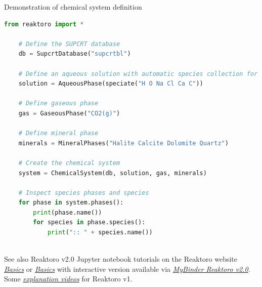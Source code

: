 %
%
\begin{frame}{Demonstration of chemical system definition}
	
\begin{lstlisting}[language=Python, caption=System definition]
    from reaktoro import *

    # Define the SUPCRT database
    db = SupcrtDatabase("supcrtbl")

    # Define an aqueous solution with automatic species collection for selected elements
    solution = AqueousPhase(speciate("H O Na Cl Ca C")) 

    # Define gaseous phase
    gas = GaseousPhase("CO2(g)")

    # Define mineral phase
    minerals = MineralPhases("Halite Calcite Dolomite Quartz")

    # Create the chemical system
    system = ChemicalSystem(db, solution, gas, minerals)
    
    # Inspect species phases and species
    for phase in system.phases():
        print(phase.name())
        for species in phase.species():
            print(":: " + species.name())
	
\end{lstlisting}
See also Reaktoro v2.0 Jupyter notebook tutorials on the Reaktoro website
%
\href{https://reaktoro.org/tutorials/basics/index.html}{\textcolor{indigo(dye)}{\it Basics}} or 
\href{https://github.com/mtsveta/reaktoro-v2-workshop/tree/main/tutorials/basics}{\textcolor{indigo(dye)}{\it Basics}} with interactive version available via \href{https://mybinder.org/v2/gh/mtsveta/reaktoro-v2-workshop/main?labpath=overview.ipynb}{\textcolor{indigo(dye)}{\it MyBinder Reaktoro v2.0}}. Some \href{https://polybox.ethz.ch/index.php/s/qStBnxUnry648U5}{\textcolor{indigo(dye)}{\it explanation videos}} for Reaktoro v1.
\end{frame}


